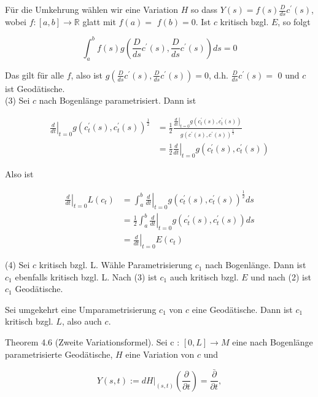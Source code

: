 \documentclass[10pt, letterpaper]{article}
\begin{document}
Für die Umkehrung wählen wir eine Variation $H$ so dass $Y(s)=f(s) \frac{D}{d s} c^{\prime}(s)$, wobei $f:[a, b] \rightarrow \mathbb{R}$ glatt mit $f(a)=$ $f(b)=0$. Ist $c$ kritisch bzgl. $E$, so folgt

$$
\int_{a}^{b} f(s) g\left(\frac{D}{d s} c^{\prime}(s), \frac{D}{d s} c^{\prime}(s)\right) d s=0
$$

Das gilt für alle $f$, also ist $g\left(\frac{D}{d s} c^{\prime}(s), \frac{D}{d s} c^{\prime}(s)\right)=0$, d.h. $\frac{D}{d s} c^{\prime}(s)=$ 0 und $c$ ist Geodätische.\\
(3) Sei $c$ nach Bogenlänge parametrisiert. Dann ist

$$
\begin{aligned}
\left.\frac{d}{d t}\right|_{t=0} g\left(c_{t}^{\prime}(s), c_{t}^{\prime}(s)\right)^{\frac{1}{2}} & =\frac{1}{2} \frac{\left.\frac{d}{d t}\right|_{t=0} g\left(c_{t}^{\prime}(s), c_{t}^{\prime}(s)\right)}{g\left(c^{\prime}(s), c^{\prime}(s)\right)^{\frac{1}{2}}} \\
& =\left.\frac{1}{2} \frac{d}{d t}\right|_{t=0} g\left(c_{t}^{\prime}(s), c_{t}^{\prime}(s)\right)
\end{aligned}
$$

Also ist

$$
\begin{aligned}
\left.\frac{d}{d t}\right|_{t=0} L\left(c_{t}\right) & =\left.\int_{a}^{b} \frac{d}{d t}\right|_{t=0} g\left(c_{t}^{\prime}(s), c_{t}^{\prime}(s)\right)^{\frac{1}{2}} d s \\
& =\left.\frac{1}{2} \int_{a}^{b} \frac{d}{d t}\right|_{t=0} g\left(c_{t}^{\prime}(s), c_{t}^{\prime}(s)\right) d s \\
& =\left.\frac{d}{d t}\right|_{t=0} E\left(c_{t}\right)
\end{aligned}
$$

(4) Sei $c$ kritisch bzgl. L. Wähle Parametrisierung $c_{1}$ nach Bogenlänge. Dann ist $c_{1}$ ebenfalls kritisch bzgl. L. Nach (3) ist $c_{1}$ auch kritisch bzgl. $E$ und nach (2) ist $c_{1}$ Geodätische.

Sei umgekehrt eine Umparametrisierung $c_{1}$ von $c$ eine Geodätische. Dann ist $c_{1}$ kritisch bzgl. $L$, also auch $c$.

Theorem 4.6 (Zweite Variationsformel). Sei c : $[0, L] \rightarrow M$ eine nach Bogenlänge parametrisierte Geodätische, $H$ eine Variation von $c$ und

$$
Y(s, t):=\left.d H\right|_{(s, t)}\left(\frac{\partial}{\partial t}\right)=\frac{\bar{\partial}}{\partial t},
$$
\end{document}
